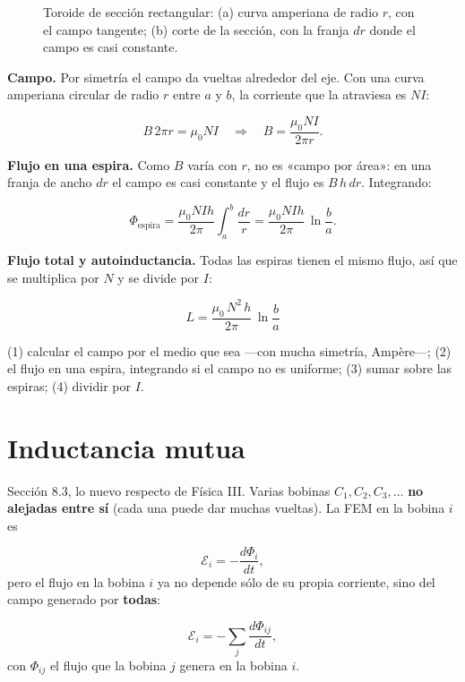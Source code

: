 \documentclass[12pt,a4paper]{article}
\begin{document}
\begin{figure}[H]
  \centering
  
  \caption{Toroide de sección rectangular: (a) curva amperiana de radio $r$, con el campo tangente; (b) corte de la sección, con la franja $dr$ donde el campo es casi constante.}
\end{figure}

\textbf{Campo.} Por simetría el campo da vueltas alrededor del eje. Con una curva
amperiana circular de radio $r$ entre $a$ y $b$, la corriente que la atraviesa
es $N I$:

\[
B\,2\pi r = \mu_0 N I \quad\Longrightarrow\quad B = \frac{\mu_0 N I}{2\pi r}.
\]

\textbf{Flujo en una espira.} Como $B$ varía con $r$, no es «campo por área»: en una
franja de ancho $dr$ el campo es casi constante y el flujo es $B\,h\,dr$.
Integrando:

\[
\Phi_{\text{espira}} = \frac{\mu_0 N I h}{2\pi}\int_a^b\frac{dr}{r}
= \frac{\mu_0 N I h}{2\pi}\,\ln\frac{b}{a}.
\]

\textbf{Flujo total y autoinductancia.} Todas las espiras tienen el mismo flujo, así
que se multiplica por $N$ y se divide por $I$:

\begin{keybox}
\[
\boxed{\ L = \frac{\mu_0\,N^2\,h}{2\pi}\,\ln\frac{b}{a}\ }
\]
\end{keybox}

\begin{notebox}
(1) calcular el campo por el medio que sea ---con
mucha simetría, Ampère---; (2) el flujo en una espira, integrando si el campo
no es uniforme; (3) sumar sobre las espiras; (4) dividir por $I$.
\end{notebox}

\section{Inductancia mutua}

Sección 8.3, lo nuevo respecto de Física III. Varias bobinas
$C_1, C_2, C_3,\dots$ \textbf{no alejadas entre sí} (cada una puede dar muchas
vueltas). La FEM en la bobina $i$ es

\[
\mathcal{E}_i = -\frac{d\Phi_i}{dt},
\]
pero el flujo en la bobina $i$ ya no depende sólo de su propia corriente, sino
del campo generado por \textbf{todas}:

\[
\mathcal{E}_i = -\sum_j \frac{d\Phi_{ij}}{dt},
\]
con $\Phi_{ij}$ el flujo que la bobina $j$ genera en la bobina $i$.
\end{document}
